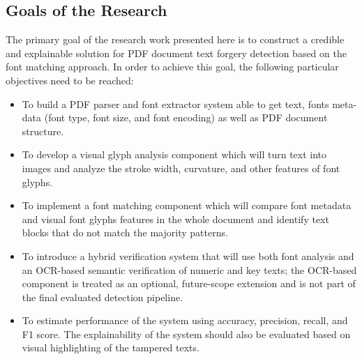 \subsection{Goals of the Research}

The primary goal of the research work presented here is to construct a credible and explainable solution for PDF document text forgery detection based on the font matching approach. In order to achieve this goal, the following particular objectives need to be reached:

\begin{itemize}
    \item To build a PDF parser and font extractor system able to get text, fonts meta-data (font type, font size, and font encoding) as well as PDF document structure.
    \item To develop a visual glyph analysis component which will turn text into images and analyze the stroke width, curvature, and other features of font glyphs.
    \item To implement a font matching component which will compare font metadata and visual font glyphs features in the whole document and identify text blocks that do not match the majority patterns.
    \item To introduce a hybrid verification system that will use both font analysis and an OCR-based semantic verification of numeric and key texts; the OCR-based component is treated as an optional, future-scope extension and is not part of the final evaluated detection pipeline.
    \item To estimate performance of the system using accuracy, precision, recall, and F1 score. The explainability of the system should also be evaluated based on visual highlighting of the tampered texts.
\end{itemize}

